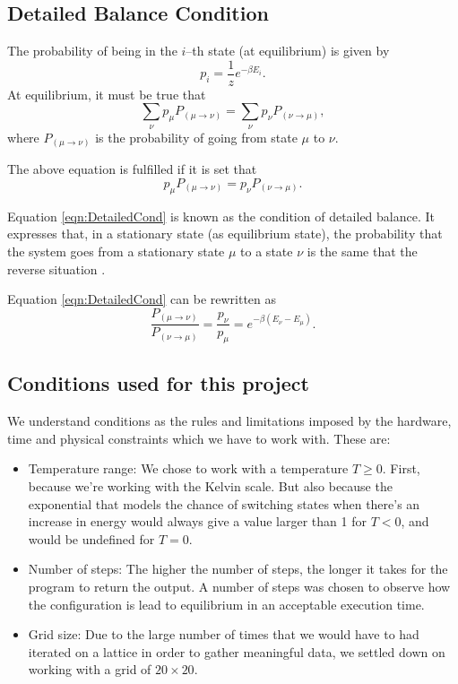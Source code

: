 \documentclass[
    10pt,
    journal,
    compsoc,
    english
]{IEEEtran}
\begin{document}
\subsection{Detailed Balance Condition}
The probability of being in the $i$--th state (at equilibrium) is given by
\begin{equation*}
    p_i = \frac{1}{z}e^{-\beta E_i}.
\end{equation*}
At equilibrium, it must be true that
\begin{equation*}
    \sum_{\nu}p_{\mu}P_{(\mu\to\nu)} = \sum_{\nu}p_{\nu}P_{(\nu\to\mu)},
\end{equation*}
where $P_{(\mu\to\nu)}$ is the probability of going from state $\mu$ to $\nu$. 

The above equation is fulfilled if it is set that
\begin{equation}
\label{eqn:DetailedCond}
    p_{\mu}P_{(\mu\to\nu)} = p_{\nu}P_{(\nu\to\mu)}.
\end{equation}

Equation \eqref{eqn:DetailedCond} is known as the condition of detailed balance. It expresses that, in a stationary state (as equilibrium state), the probability that the system goes from a stationary state $\mu$ to a state $\nu$ is the same that the reverse situation \cite{detailedbalance}.

Equation \eqref{eqn:DetailedCond} can be rewritten as
\begin{equation*}
\label{eqn:ratio-prob}
    \frac{P_{(\mu\to\nu)}}{P_{(\nu\to\mu)}} = \frac{p_{\nu}}{p_{\mu}} = e^{-\beta (E_\nu-E_\mu)}.
\end{equation*}

\subsection{Conditions used for this project}
We understand conditions as the rules and limitations imposed by the hardware, time and physical constraints which we have to work with. These are:
\begin{itemize}
    \item Temperature range: We chose to work with a temperature $T \geq 0$. First, because we're working with the Kelvin scale. But also because the exponential that models the chance of switching states when there's an increase in energy would always give a value larger than 1 for $T < 0$, and would be undefined for $T=0$.
    \item Number of steps: The higher the number of steps, the longer it takes for the program to return the output. A number of steps was chosen to observe how the configuration is lead to equilibrium in an acceptable execution time.
    \item Grid size: Due to the large number of times that we would have to had iterated on a lattice in order to gather meaningful data, we settled down on working with a grid of $20 \times 20$.
\end{itemize}
\end{document}
